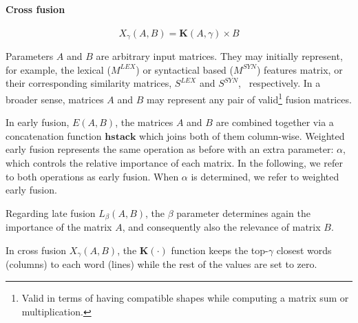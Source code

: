 \documentclass{llncs}
\begin{document}
\paragraph{Cross fusion}
\begin{equation}
X_{\gamma}(A,B) = \mathbf{K}(A,\gamma) \times B
\end{equation}


Parameters $A$ and $B$ are arbitrary input matrices. They may initially represent, for example,  the lexical ($M^{LEX}$) or syntactical based ($M^{SYN}$) features matrix, or their  corresponding similarity matrices, $S^{LEX}$ and  $S^{SYN}$, ~respectively. In a broader sense, matrices $A$ and $B$ may represent any pair of valid\footnote{Valid in terms of having compatible shapes while computing a matrix sum or multiplication.} fusion matrices. 

In early fusion, $E(A,B)$, the matrices $A$ and $B$ are combined together via a concatenation function $\mathbf{hstack}$ which joins both of them column-wise. Weighted early fusion  represents the same operation as before with an extra parameter: $\alpha$, which controls the relative importance of each matrix. In the following, we refer to both operations as early fusion. When $\alpha$ is determined, we refer to weighted early fusion.

Regarding late fusion $L_\beta(A,B)$, the  $\beta$ parameter determines again the importance of the  matrix $A$,  and consequently also the relevance of matrix $B$.

In cross fusion $X_\gamma(A,B)$, the $\mathbf{K}(\cdot)$ function keeps the top-$\gamma$ closest words (columns) to each word (lines) while the rest of the values are set to zero. 
\end{document}
